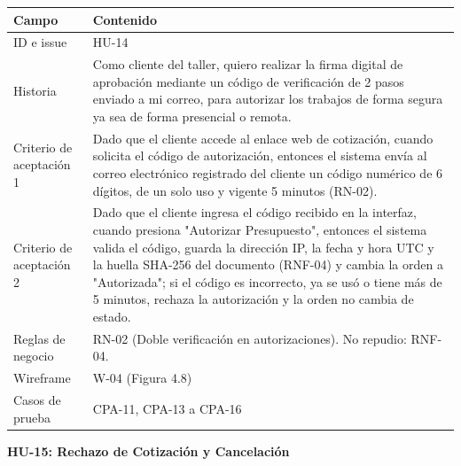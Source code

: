 {\def\LTcaptype{none} %
\begin{longtable}[]{@{}
  >{\raggedright\arraybackslash}p{}
  >{\raggedright\arraybackslash}p{}@{}}
\toprule\noalign{}
\begin{minipage}[b]{\linewidth}\raggedright
\textbf{Campo}
\end{minipage} & \begin{minipage}[b]{\linewidth}\raggedright
\textbf{Contenido}
\end{minipage} \\
\midrule\noalign{}
\endhead
\bottomrule\noalign{}
\endlastfoot
ID e issue & HU-14 \\
Historia & Como cliente del taller, quiero realizar la firma digital de
aprobación mediante un código de verificación de 2 pasos enviado a mi
correo, para autorizar los trabajos de forma segura ya sea de forma
presencial o remota. \\
Criterio de aceptación 1 & Dado que el cliente accede al enlace web de
cotización, cuando solicita el código de autorización, entonces el
sistema envía al correo electrónico registrado del cliente un código
numérico de 6 dígitos, de un solo uso y vigente 5 minutos (RN-02). \\
Criterio de aceptación 2 & Dado que el cliente ingresa el código
recibido en la interfaz, cuando presiona "Autorizar Presupuesto",
entonces el sistema valida el código, guarda la dirección IP, la fecha
y hora UTC y la huella SHA-256 del documento (RNF-04) y cambia la orden
a "Autorizada"; si el código es incorrecto, ya se usó o tiene más de 5
minutos, rechaza la autorización y la orden no cambia de estado. \\
Reglas de negocio & RN-02 (Doble verificación en autorizaciones). No
repudio: RNF-04. \\
Wireframe & W-04 (Figura 4.8) \\
Casos de prueba & CPA-11, CPA-13 a CPA-16 \\
\end{longtable}
}

\textbf{HU-15: Rechazo de Cotización y Cancelación}

